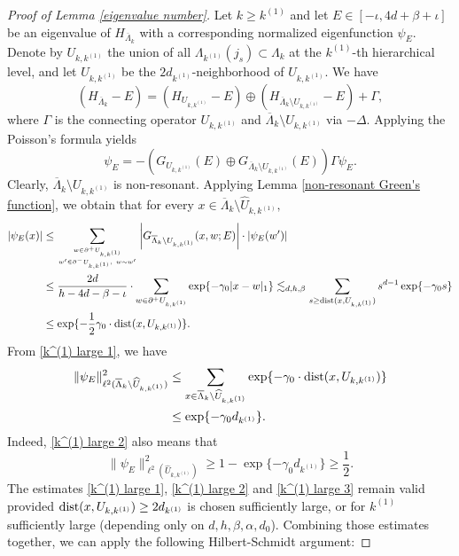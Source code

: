 \documentclass[11pt,reqno,UTF8,twoside]{amsart}
\newcommand{\barLambda}{\overline{\Lambda}}
\newcommand{\dist}{{\rm dist}}
\theoremstyle{definition}
\numberwithin{equation}{section}
\begin{document}
\begin{proof}[Proof of Lemma \ref{eigenvalue number}]
Let $k \geq k^{(1)}$  and let $E \in [-\iota, 4d+\beta+\iota]$ be an eigenvalue of $H_{\barLambda_k}$ with a corresponding normalized eigenfunction $\psi_E$. Denote by $U_{k,k^{(1)}}$ the union of all $\Lambda_{k^{(1)}}(j_s) \subset \Lambda_{k}$ at the $k^{(1)}$-th hierarchical level, and let $\widehat{U}_{k,k^{(1)}}$ be the $2d_{k^{(1)}}$-neighborhood of $U_{k,k^{(1)}}$. 
We have 
  \[(H_{\barLambda_k}-E)=(H_{U_{k,k^{(1)}}}-E)\oplus (H_{\barLambda_k\setminus U_{k,k^{(1)}}}-E)+\Gamma,\]
where $\Gamma$ is the connecting operator  $U_{k,k^{(1)}}$ and $\barLambda_k\setminus U_{k,k^{(1)}}$ via  $-\Delta$. Applying the Poisson's  formula yields 
\[\psi_E=-\left(G_{U_{k,k^{(1)}}}(E)\oplus G_{\barLambda_k\setminus U_{k,k^{(1)}}}(E)\right)  \Gamma \psi_E.\]
Clearly, $\barLambda_k\setminus U_{k,k^{(1)}}$ is non-resonant. Applying Lemma \ref{non-resonant Green's function}, we obtain that for every $x\in \barLambda_k\setminus \widehat{U}_{k,k^{(1)}},$
\begin{align}\label{k^(1) large 1}
\notag  |\psi_E(x)|& \leq \sum_{w\in \partial^+ U_{k,k^{(1)}} \atop w'\in \partial^-U_{k,k^{(1)}},\ w\sim w'} \left| G_{\barLambda_k\setminus U_{k,k^{(1)}}}(x,w;E) \right| \cdot |\psi_E(w')| \\
      \notag       &\leq  \frac{2d}{h-4d-\beta-\iota} \cdot \sum_{w\in \partial^+ U_{k,k^{(1)}} } \exp\{-\gamma_0 |x-w|_1\}  \lesssim_{d,h,\beta} \sum_{s\geq \dist(x,U_{k,k^{(1)}})}s^{d-1} \exp\{-\gamma_0 s\} \\
      &\leq \exp\{-\frac{1}{2}\gamma_0 \cdot \dist(x,U_{k,k^{(1)}})\}.
\end{align}
From \eqref{k^(1) large 1}, we have 
\begin{align}\label{k^(1) large 2}
 \notag \|\psi_E\|_{\ell^2(\barLambda_k\setminus \widehat{U}_{k,k^{(1)}})}^2 & \leq \sum_{x\in \barLambda_k\setminus \widehat{U}_{k,k^{(1)}}} \exp\{-\gamma_0\cdot \dist(x,U_{k,k^{(1)}})\} \\
   & \leq \exp\{-\gamma_0 d_{k^{(1)}}\}. 
\end{align}
Indeed, \eqref{k^(1) large 2} also means that 
\begin{equation}\label{k^(1) large 3}
  \|\psi_E\|_{\ell^2(\widehat{U}_{k,k^{(1)}})}^2 \geq 1-\exp\{-\gamma_0 d_{k^{(1)}}\}\geq \frac{1}{2}. 
\end{equation}
The estimates  \eqref{k^(1) large 1}, \eqref{k^(1) large 2} and \eqref{k^(1) large 3}  remain  valid provided $\dist(x,U_{k,k^{(1)}})\geq 2d_{k^{(1)}}$ is chosen sufficiently large, or   for $k^{(1)}$ sufficiently large (depending only on $d,h,\beta,\alpha,d_0$).  Combining  those estimates together, we can apply the following Hilbert-Schmidt argument: 

\end{proof}
\end{document}
